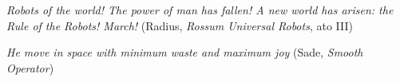 \begin{epigrafe}
\textit{Robots of the world! The power of man has fallen! A new world
has arisen: the Rule of the Robots! March!} (Radius, \textit{Rossum Universal
Robots}, ato III)

\textit{He move in space with minimum waste and maximum joy} (Sade, \textit{Smooth Operator})
\end{epigrafe}